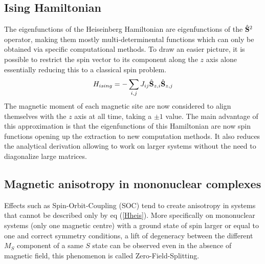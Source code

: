 \documentclass[10pt]{report}
\numberwithin{equation}{section}
\begin{document}
\subsection*{Ising Hamiltonian}

The eigenfunctions of the Heiseinberg Hamiltonian are eigenfunctions of the $\hat{\vb S}^2$ operator, making them mostly multi-determinental functions which can only be obtained via specific computational methods.
To draw an easier picture, it is possible to restrict the spin vector to its component along the $z$ axis alone essentially reducing this to a classical spin problem.
\begin{equation}
    H_{ising}=- \sum_{i,j} J_{ij} \hat{\vb S}_{z,i} \hat{\vb S}_{z,j}
\end{equation}
The magnetic moment of each magnetic site are now considered to align themselves with the $z$ axis at all time, taking a $\pm 1$ value.
The main advantage of this approximation is that the eigenfunctions of this Hamiltonian are now spin functions opening up the extraction to new computation methods. 
It also reduces the analytical derivation allowing to work on larger systems without the need to diagonalize large matrices.

\subsection{Magnetic anisotropy in mononuclear complexes}

\par Effects such as Spin-Orbit-Coupling (SOC) tend to create anisotropy in systems that cannot be described only by eq (\ref{Hheis}). 
More specifically on mononuclear systems (only one magnetic centre) with a ground state of spin larger or equal to one and correct symmetry conditions, a lift of degeneracy between the different $M_S$ component of a same $S$ state can be observed even in the absence of magnetic field, this phenomenon is called Zero-Field-Splitting.
\end{document}
